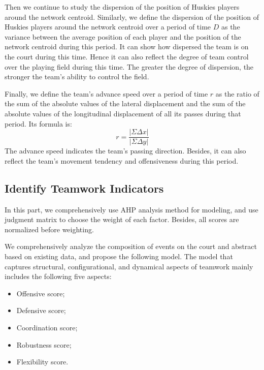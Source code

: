 \documentclass{mcmthesis}
\begin{document}
	Then we continue to study the dispersion of the position of Huskies players around the network centroid.  Similarly, we define the dispersion of the position of Huskies players around the network centroid over a period of time $D$ as the variance between the average position of each player and the position of the network centroid during this period.  It can show how dispersed the team is on the court during this time.  Hence it can also reflect the degree of team control over the playing field during this time.  The greater the degree of dispersion, the stronger the team's ability to control the field.

	Finally, we define the team's advance speed over a period of time $r$ as the ratio of the sum of the absolute values ​​of the lateral displacement and the sum of the absolute values ​​of the longitudinal displacement of all its passes during that period. Its formula is:
	$$r=\frac{|\Sigma \Delta x|}{|\Sigma \Delta y|}$$
	The advance speed indicates the team's passing direction.  Besides, it can also reflect the team's movement tendency and offensiveness during this period.
\subsection{Identify Teamwork Indicators}
	In this part, we comprehensively use AHP analysis method for modeling, and use judgment matrix to choose the weight of each factor. Besides, all scores are normalized before weighting.

	We comprehensively analyze the composition of events on the court and abstract based on existing data, and propose the following model.  The model that captures structural, configurational, and dynamical aspects of teamwork mainly includes the following five aspects:
	\begin{itemize}
		\item Offensive score;
		\item Defensive score;
		\item Coordination score;
		\item Robustness score;
		\item Flexibility score.
	\end{itemize}
\end{document}
